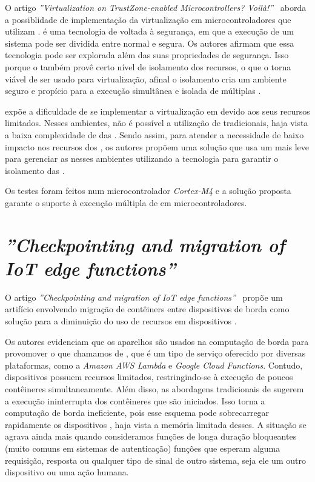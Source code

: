 O artigo \textit{''Virtualization on TrustZone-enabled Microcontrollers? Voilà!''}~\cite{pinto2019virtualization} aborda a possiblidade de implementação da virtualização em microcontroladores que utilizam \trustzone. \trustzone é uma tecnologia de \hardware voltada à segurança, em que a execução de um sistema pode ser dividida entre normal e segura. Os autores afirmam que essa tecnologia pode ser explorada além das suas propriedades de segurança. Isso porque o \trustzone também provê certo nível de isolamento dos recursos, o que o torna viável de ser usado para virtualização, afinal o isolamento cria um ambiente seguro e propício para a execução simultânea e isolada de múltiplas \vms.

 expõe a dificuldade de se implementar a virtualização em \mcus devido aos seus recursos limitados. Nesses ambientes, não é possível a utilização de \hypervisors tradicionais, haja vista a baixa complexidade de \hardware das \mcus. Sendo assim, para atender a necessidade de baixo impacto nos recursos dos \mcus, os autores propõem uma solução que usa um \hypervisor mais leve para gerenciar as \vms nesses ambientes utilizando a tecnologia \trustzone para garantir o isolamento das \vms.

Os testes foram feitos num microcontrolador \textit{Cortex-M4} e a solução proposta garante o suporte à execução múltipla de \vms em microcontroladores.

\section{\textit{''Checkpointing and migration of IoT edge functions''}}


O artigo \textit{''Checkpointing and migration of IoT edge functions''}~\cite{karhula2019checkpointing} propõe um artifício envolvendo migração de contêiners entre dispositivos \iot de borda como solução para a diminuição do uso de recursos em dispositivos \iot.

Os autores evidenciam que os aparelhos \iot são usados na computação de borda para provomover o que chamamos de \faas, que é um tipo de serviço oferecido por diversas plataformas, como a \textit{Amazon AWS Lambda} e \textit{Google Cloud Functions}. Contudo, dispositivos \iot possuem recursos limitados, restringindo-se à execução de poucos contêineres simultaneamente. Além disso, as abordagens tradicionais de \faas sugerem a execução ininterrupta dos contêineres que são iniciados. Isso torna a computação de borda ineficiente, pois esse esquema pode sobrecarregar rapidamente os dispositivos \iot, haja vista a memória limitada desses. A situação se agrava ainda mais quando consideramos funções de longa duração bloqueantes (muito comuns em sistemas de autenticação) \eg funções que esperam alguma requisição, resposta ou qualquer tipo de sinal de outro sistema, seja ele um outro dispositivo \iot ou uma ação humana.

